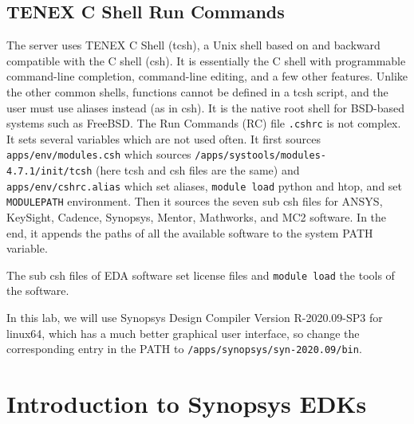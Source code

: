 \documentclass[a4paper,12pt,twoside]{article}
\begin{document}
\subsection{TENEX C Shell Run Commands}
The server uses TENEX C Shell (tcsh), a Unix shell based on and backward compatible with the C shell (csh). It is essentially the C shell with programmable command-line completion, command-line editing, and a few other features. Unlike the other common shells, functions cannot be defined in a tcsh script, and the user must use aliases instead (as in csh). It is the native root shell for BSD-based systems such as FreeBSD. The Run Commands (RC) file \texttt{.cshrc} is not complex. It sets several variables which are not used often. It first sources \texttt{apps/env/modules.csh} which sources \texttt{/apps/systools/modules-4.7.1/init/tcsh} (here tcsh and csh files are the same) and \texttt{apps/env/cshrc.alias} which set aliases, \texttt{module load} python and htop, and set \texttt{MODULEPATH} environment. Then it sources the seven sub csh files for ANSYS, KeySight, Cadence, Synopsys, Mentor, Mathworks, and MC2 software. In the end, it appends the paths of all the available software to the system PATH variable.

The sub csh files of EDA software set license files and \texttt{module load} the tools of the software.

In this lab, we will use Synopsys Design Compiler Version R-2020.09-SP3 for linux64, which has a much better graphical user interface, so change the corresponding entry in the PATH to \texttt{/apps/synopsys/syn-2020.09/bin}.

\section{Introduction to Synopsys EDKs}
\end{document}
